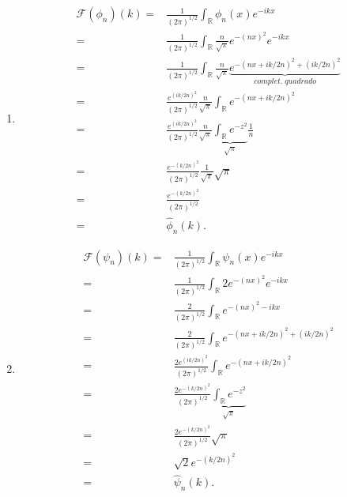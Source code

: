 \documentclass{article}
\begin{document}
\begin{enumerate}
\begin{enumerate}
					\item
						$$
						\begin{aligned}
						\mathcal{F}(\phi_{n})(k) = & \frac{1}{(2\pi)^{1/2}}\int_{\mathbb{R}} \phi_{n}(x)e^{-ikx}
						\\
						 = & \frac{1}{(2\pi)^{1/2}}\int_{\mathbb{R}} \frac{n}{\sqrt{\pi}}e^{-(nx)^{2}} e^{-ikx}
						 \\
						 = & \frac{1}{(2\pi)^{1/2}}\int_{\mathbb{R}} \frac{n}{\sqrt{\pi}} \underbrace{ e^{-(nx + ik/2n)^{2} + (ik/2n)^{2}} }_{complet.\; quadrado}
						 \\
						 = & \frac{e^{(ik/2n)^{2}}}{(2\pi)^{1/2}} \frac{n}{\sqrt{\pi}} \int_{\mathbb{R}} e^{-(nx + ik/2n)^{2}}
						 \\
						 = & \frac{e^{(ik/2n)^{2}}}{(2\pi)^{1/2}} \frac{n}{\sqrt{\pi}} \underbrace{ \int_{\mathbb{R}} e^{-z^{2}} }_{\sqrt{\pi}} \frac{1}{n}
						 \\
						 = & \frac{e^{-(k/2n)^{2}}}{(2\pi)^{1/2}} \frac{1}{\sqrt{\pi}} \sqrt{\pi}
						 \\
						 = & \frac{e^{-(k/2n)^{2}}}{(2\pi)^{1/2}}
						 \\
						 = & \hat{\phi}_{n}(k).
						\end{aligned}
						$$
					\item 
					$$
					\begin{aligned}
					\mathcal{F}(\psi_{n})(k) = & \frac{1}{(2\pi)^{1/2}}\int_{\mathbb{R}} \psi_{n}(x)e^{-ikx}
					\\
					= & \frac{1}{(2\pi)^{1/2}}\int_{\mathbb{R}}  2 e^{-(nx)^{2}}e^{-ikx}
					\\
					= & \frac{2}{(2\pi)^{1/2}}\int_{\mathbb{R}} e^{-(nx)^{2} -ikx }
					\\
					= & \frac{2}{(2\pi)^{1/2}}\int_{\mathbb{R}} e^{-(nx + ik/2n)^{2} + (ik/2n)^{2}}
					\\
					= & \frac{2e^{(ik/2n)^{2}} }{(2\pi)^{1/2}}\int_{\mathbb{R}} e^{-(nx + ik/2n)^{2} }
					\\
					= & \frac{2e^{-(k/2n)^{2}} }{(2\pi)^{1/2}} \underbrace{ \int_{\mathbb{R}} e^{-z^{2} } }_{\sqrt{\pi}}
					\\
					= & \frac{2 e^{-(k/2n)^{2}} }{(2\pi)^{1/2}} \sqrt{\pi}
					\\
					= & \sqrt{2} e^{-(k/2n)^{2}}
					\\
					= & \hat{\psi}_{n}(k). 
					\end{aligned}
					$$
			\end{enumerate}
	\end{enumerate}
	
	
\end{document}
